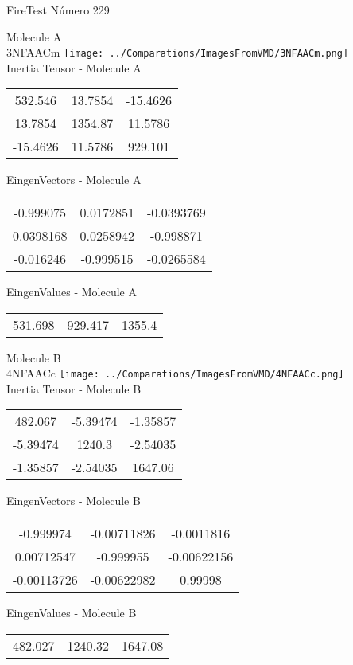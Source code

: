 \vtab[-2cm]
\begin{center}
{\large FireTest \tab Número 229}
\end{center}
\begin{multicols}{2}
\begin{center}

Molecule A \\ 
3NFAACm
\texttt{[image: ../Comparations/ImagesFromVMD/3NFAACm.png]}
\\
Inertia Tensor - Molecule A \\
\vtab

\begin{tabular}{|c c c|}
532.546	 & 	13.7854	 & 	-15.4626	 \\
13.7854	 & 	1354.87	 & 	11.5786	 \\
-15.4626	 & 	11.5786	 & 	929.101
\end{tabular}

\vtab
 EingenVectors - Molecule A     \\
\vtab
\begin{tabular}{|c c c|}
-0.999075	 & 	0.0172851	 & 	-0.0393769	 \\
0.0398168	 & 	0.0258942	 & 	-0.998871	 \\
-0.016246	 & 	-0.999515	 & 	-0.0265584
\end{tabular}

\vtab
 EingenValues - Molecule A     \\
\vtab
\begin{tabular}{|c c c|}
531.698	 & 	929.417	 & 	1355.4	 \\
\end{tabular}
\columnbreak

Molecule B \\ 
4NFAACc
\texttt{[image: ../Comparations/ImagesFromVMD/4NFAACc.png]}
\\
Inertia Tensor - Molecule B \\
\vtab

\begin{tabular}{|c c c|}
482.067	 & 	-5.39474	 & 	-1.35857	 \\
-5.39474	 & 	1240.3	 & 	-2.54035	 \\
-1.35857	 & 	-2.54035	 & 	1647.06
\end{tabular}

\vtab
 EingenVectors - Molecule B     \\
\vtab
\begin{tabular}{|c c c|}
-0.999974	 & 	-0.00711826	 & 	-0.0011816	 \\
0.00712547	 & 	-0.999955	 & 	-0.00622156	 \\
-0.00113726	 & 	-0.00622982	 & 	0.99998
\end{tabular}

\vtab
 EingenValues - Molecule B     \\
\vtab
\begin{tabular}{|c c c|}
482.027	 & 	1240.32	 & 	1647.08	 \\
\end{tabular}

\end{center}
\end{multicols}
